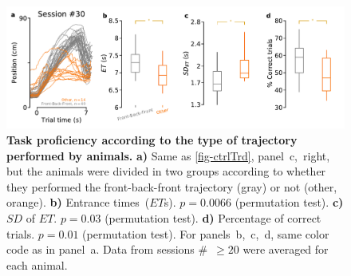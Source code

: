 \begin{figure}[!h]
  \begin{center}
    \includegraphics[width=.8\linewidth]{ch-appendicies/figures/BadCtrl.pdf}
    \caption[Different Control Trajectories]
    {\textbf{Task proficiency according to the type of trajectory performed by animals.}
    \textbf{a)}
    Same as \autoref{fig-ctrlTrd}, panel~c,~right, but the animals were divided in two groups according to whether they performed the front-back-front trajectory (gray) or not (other, orange).
    \textbf{b)}
    Entrance times~($ET$s).
    $p=0.0066$ (permutation test).
    \textbf{c)}
    $SD$ of $ET$.
    $p=0.03$ (permutation test).
    \textbf{d)}
    Percentage of correct trials.
    $p=0.01$ (permutation test).
    For panels~b,~c,~d, same color code as in panel~a.
    Data from sessions \#~$\geq20$ were averaged for each animal.
    }
    \label{fig:appendix:BadCtrl}
  \end{center}
\end{figure} 
